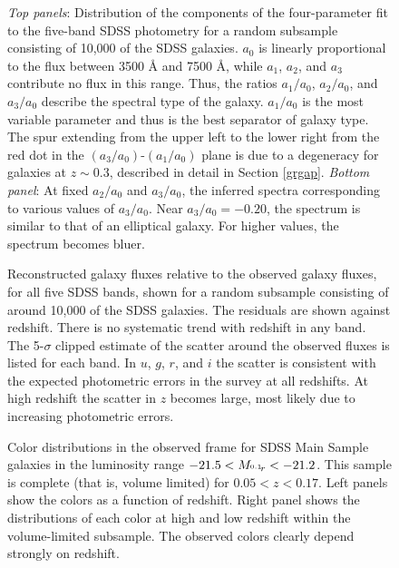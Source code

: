\clearpage
{}
\begin{figure}
\figurenum{\fignum}
\caption{\label{k_coeffdist_plot} {\it Top panels}: Distribution of
the components of the four-parameter fit to the five-band SDSS
photometry for a random subsample consisting of 10,000 of the SDSS
galaxies. $a_0$ is linearly proportional to the flux between 3500 \AA
and 7500 \AA, while $a_1$, $a_2$, and $a_3$ contribute no flux in
this range. Thus, the ratios $a_1/a_0$, $a_2/a_0$, and $a_3/a_0$
describe the spectral type of the galaxy. $a_1/a_0$ is the most
variable parameter and thus is the best separator of galaxy
type. The spur extending from the upper left to the lower right from
the red dot in the $(a_3/a_0)$-$(a_1/a_0)$ plane is due to a
degeneracy for galaxies at $z\sim 0.3$, described in detail in Section
\ref{grgap}. {\it Bottom panel}: At fixed $a_2/a_0$ and $a_3/a_0$, the
inferred spectra corresponding to various values of $a_3/a_0$. Near
$a_3/a_0=-0.20$, the spectrum is similar to that of an elliptical
galaxy. For higher values, the spectrum becomes bluer. }
\end{figure}

\clearpage
{}
\begin{figure}
\figurenum{\fignum}
\caption{\label{k_model_plot} Reconstructed galaxy fluxes relative to
the observed galaxy fluxes, for all five SDSS bands, shown for a
random subsample consisting of around 10,000 of the SDSS galaxies. The
residuals are shown against redshift.  There is no systematic trend
with redshift in any band. The 5-$\sigma$ clipped estimate of the
scatter around the observed fluxes is listed for each band. In $u$,
$g$, $r$, and $i$ the scatter is consistent with the expected
photometric errors in the survey at all redshifts. At high redshift
the scatter in $z$ becomes large, most likely due to increasing
photometric errors. }
\end{figure}

\clearpage
{}
\begin{figure}
\figurenum{\fignum}
\caption{\label{main_colors_plot.z} Color distributions in the
observed frame for SDSS Main Sample galaxies in the luminosity range
$-21.5<M_{^{{0.1}}\!{r}}<-21.2$. This sample is complete (that is,
volume limited) for $0.05<z<0.17$. Left panels show the colors as a
function of redshift. Right panel shows the distributions of each
color at high and low redshift within the volume-limited
subsample. The observed colors clearly depend strongly on redshift.}
\end{figure}

